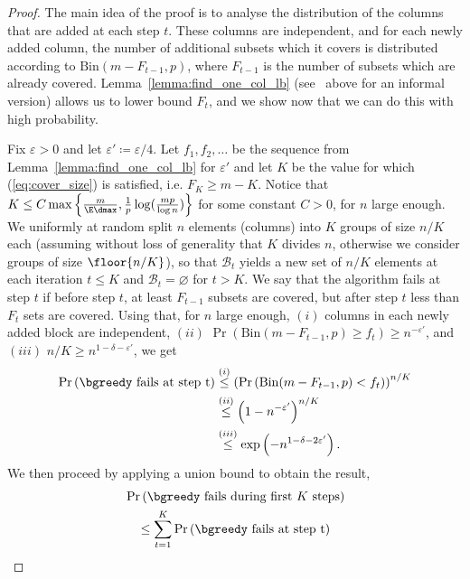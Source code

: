 \begin{proof}
The main idea of the proof is to analyse the distribution of the columns that are added at each step \(t\). These columns are independent, and for each newly added column, the number of additional subsets which it covers is distributed according to \(\mathrm{Bin}(m - F_{t - 1}, p)\), where \(F_{t - 1}\) is the number of subsets which are already covered. Lemma~\ref{lemma:find_one_col_lb} (see~ above for an informal version) allows us to lower bound \(F_t\), and we show now that we can do this with high probability.

\noindent
Fix \(\varepsilon > 0\) and let \(\varepsilon' \coloneqq \varepsilon / 4\). Let \(f_1, f_2, \ldots\) be the sequence from Lemma~\ref{lemma:find_one_col_lb} for \(\varepsilon'\) and let \(K\) be the value for which (\ref{eq:cover_size}) is satisfied, i.e. \(F_{K} \geq m - K\). Notice that $K \leq C \max\left\{ \frac{m}{\E \dmax}, \frac{1}{p} \log(\frac{mp}{\log{n}}) \right\}$ for some constant $C > 0$, for \(n\) large enough. We uniformly at random split \(n\) elements (columns) into \(K\) groups of size \(n / K\) each (assuming without loss of generality that $K$ divides $n$, otherwise we consider groups of size \(\floor{n / K}\)), so that $\mathcal{B}_t$ yields a new set of $n/K$ elements at each iteration $t \leq K$ and \(\mathcal{B}_t = \varnothing\) for \(t > K\). We say that the algorithm fails at step \(t\) if before step \(t\), at least \(F_{t - 1}\) subsets are covered, but after step \(t\) less than \(F_t\) sets are covered. 
Using that, for \(n\) large enough, $(i)$ columns in each newly added block are independent, \((ii)\) \(\Pr \left(\mathrm{Bin}(m - F_{t - 1}, p) \geq f_t\right) \geq n^{-\varepsilon'}\), and \((iii)\) \(n / K \geq n^{1 - \delta - \varepsilon'}\), we get
\begin{align*}
\Pr\left(\text{\bgreedy fails at step t} \right) &\overset{(i)}\leq \left(\Pr\left(\mathrm{Bin}(m - F_{t - 1}, p) < f_t\right) \right)^{n / K} \\
&\overset{(ii)}{\leq} \left( 1 - n^{-\varepsilon'} \right)^{n / K} \\
& \overset{(iii)}{\leq} \exp\left( - n^{1 - \delta - 2\varepsilon'}\right).
\end{align*}
We then proceed by applying a union bound to obtain the result,
\begin{align*}
&\Pr \left(\bgreedy\text{ fails during first } K \text{ steps}\right) \\
&\quad \leq \sum_{t=1}^K \Pr\left( \bgreedy\text{ fails at step t}\right) \\

\end{align*}
\end{proof}
